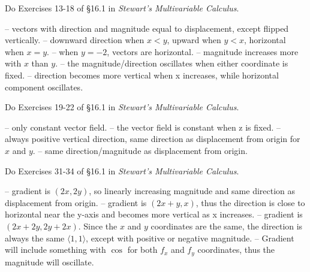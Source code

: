 \documentclass[12pt]{exam}
\begin{document}
\begin{questions}
\question Do Exercises 13-18 of §16.1 in \emph{Stewart's Multivariable Calculus}.
	\begin{solution}
		\begin{questions}
			\setcounter{question}{12}
			\question {} -- vectors with direction and magnitude equal to displacement, except flipped vertically.
			\question {} -- downward direction when $x < y$, upward when $y < x$, horizontal when $x = y$.
			\question {} -- when $y = -2$, vectors are horizontal.
			\question {} -- magnitude increases more with $x$ than $y$.
			\question {} -- the magnitude/direction oscillates when either coordinate is fixed.
			\question {} -- direction becomes more vertical when x increases, while horizontal component oscillates.
		\end{questions}
	\end{solution}
\setcounter{question}{7}
\question Do Exercises 19-22 of §16.1 in \emph{Stewart's Multivariable Calculus}.
	\begin{solution}
		\begin{questions}
			\setcounter{question}{18}
			\question {} -- only constant vector field.
			\question {} -- the vector field is constant when z is fixed.
			\question {} -- always positive vertical direction, same direction as displacement from origin for $x$ and $y$.
			\question {} -- same direction/magnitude as displacement from origin.
		\end{questions}
	\end{solution}
\setcounter{question}{8}
\question Do Exercises 31-34 of §16.1 in \emph{Stewart's Multivariable Calculus}.
	\begin{solution}
		\begin{questions}
			\setcounter{question}{30}
			\question {} -- gradient is $(2x, 2y)$, so linearly increasing magnitude and same direction as displacement from origin.
			\question {} -- gradient is $(2x + y, x)$, thus the direction is close to horizontal near the y-axis and becomes more vertical as x increases.
			\question {} -- gradient is $(2x + 2y, 2y + 2x)$. Since the $x$ and $y$ coordinates are the same, the direction is always the same $\langle 1, 1 \rangle$, except with positive or negative magnitude.
			\question {} -- Gradient will include something with $\cos$ for both $f_x$ and $f_y$ coordinates, thus the magnitude will oscillate.
		\end{questions}
	\end{solution}
\end{questions}
\end{document}
